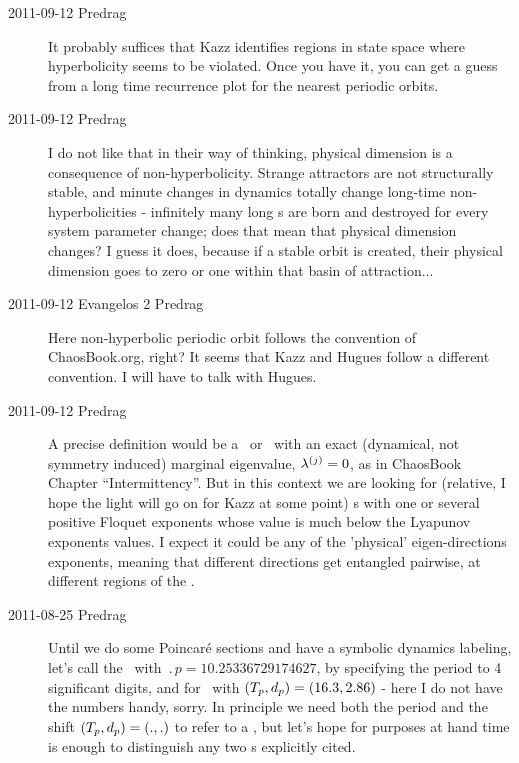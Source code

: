 \begin{description}
\item[2011-09-12 Predrag] It probably suffices that Kazz identifies 	
regions in state space where hyper\-bolicity seems to 	be violated. Once
you have it, you can get a guess from a long time recurrence plot for the
nearest periodic orbits.

\item[2011-09-12 Predrag] I do not like that in their way of thinking,
physical dimension is a consequence of non-hyperbolicity. Strange
attractors are not structurally stable, and minute changes in dynamics
totally change long-time non-hyperbolicities - infinitely many long \po s
are born and destroyed for every system parameter change; does that mean
that physical dimension changes? I guess it does, because if a stable
orbit is created, their physical dimension goes to zero or one within
that basin of attraction...

\item[2011-09-12 Evangelos 2 Predrag] Here non-hyperbolic periodic orbit follows
the convention of ChaosBook.org, right? It seems that Kazz and Hugues follow a
different convention. I will have to talk with Hugues.

\item[2011-09-12 Predrag]                           \toCB
A precise definition would be a \po\ or \rpo\ with an exact (dynamical,
not symmetry induced) marginal eigenvalue, $\eigExp[j] = 0$, as in
ChaosBook Chapter ``Intermittency''. But in this context we are looking
for (relative, I hope the light will go on for Kazz at some point) \po s
with one or several positive Floquet exponents whose value is much below
the Lyapunov exponents values. I expect it could be any of the 'physical'
eigen-directions exponents, meaning that different directions get
entangled pairwise, at different regions of the \statesp.

\item[2011-08-25 Predrag]
Until we do some Poincar\'e sections and have a symbolic dynamics
labeling, let's call  the \po\ with
$\period{p}=10.25336729174627$, by specifying the period to 4 significant
digits, and  for \rpo\ with
$({T_{p}},d_p)=(16.3,2.86)$ - here I do not have the numbers
handy, sorry. In principle we need both the period and the shift
$({T_{p}},d_p)=(.,.)$ to refer to a \rpo, but let's hope for
purposes at hand time is enough to distinguish any two \rpo s explicitly
cited.


\end{description}

